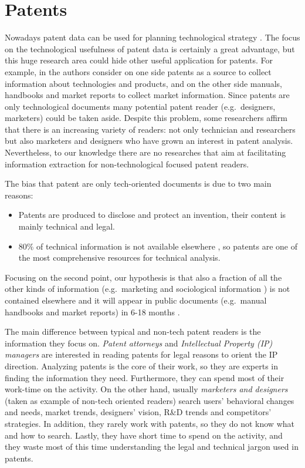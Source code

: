 \documentclass[b5paper,]{book}
\providecommand{\tightlist}{%
  \setlength{\itemsep}{0pt}\setlength{\parskip}{0pt}}
\theoremstyle{definition}
\theoremstyle{definition}
\theoremstyle{definition}
\theoremstyle{remark}
\begin{document}
\section{Patents}\label{sotadocumentspatents}

Nowadays patent data can be used for planning technological strategy
\citep{azoulay2009impact, ernst2003patent}. The focus on the
technological usefulness of patent data is certainly a great advantage,
but this huge research area could hide other useful application for
patents. For example, in \citep{jin2015technology} the authors consider
on one side patents as a source to collect information about
technologies and products, and on the other side manuals, handbooks and
market reports to collect market information. Since patents are only
technological documents many potential patent reader (e.g.~designers,
marketers) could be taken aside. Despite this problem, some researchers
\citep{bonino2010review} affirm that there is an increasing variety of
readers: not only technician and researchers but also marketers and
designers who have grown an interest in patent analysis. Nevertheless,
to our knowledge there are no researches that aim at facilitating
information extraction for non-technological focused patent readers.

The bias that patent are only tech-oriented documents is due to two main
reasons:

\begin{itemize}
\tightlist
\item
  Patents are produced to disclose and protect an invention, their
  content is mainly technical and legal.
\item
  80\% of technical information is not available elsewhere
  \citep{terragno1979}, so patents are one of the most comprehensive
  resources for technical analysis.
\end{itemize}

Focusing on the second point, our hypothesis is that also a fraction of
all the other kinds of information (e.g.~marketing and sociological
information ) is not contained elsewhere and it will appear in public
documents (e.g.~manual handbooks and market reports) in 6-18 months
\citep{golzio2012}.

The main difference between typical and non-tech patent readers is the
information they focus on. \emph{Patent attorneys} and
\emph{Intellectual Property (IP) managers} are interested in reading
patents for legal reasons to orient the IP direction. Analyzing patents
is the core of their work, so they are experts in finding the
information they need. Furthermore, they can spend most of their
work-time on the activity. On the other hand, usually \emph{marketers
and designers} (taken as example of non-tech oriented readers) search
users' behavioral changes and needs, market trends, designers' vision,
R\&D trends and competitors' strategies. In addition, they rarely work
with patents, so they do not know what and how to search. Lastly, they
have short time to spend on the activity, and they waste most of this
time understanding the legal and technical jargon used in patents.
\end{document}
